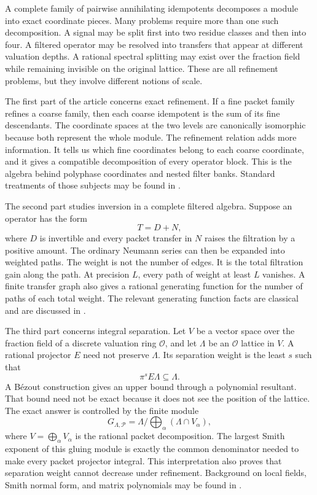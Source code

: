 \documentclass[11pt,a4paper]{article}
\theoremstyle{definition}
\theoremstyle{remark}
\newcommand{\OO}{\mathcal O}
\newcommand{\Pcal}{\mathcal P}
\providecommand{\OO}{\mathcal O}
\theoremstyle{definition}\newtheorem{construction}[theorem]{Construction}\newtheorem{certificate}[theorem]{Numerical Certificate}
\theoremstyle{remark}\newtheorem{boundary}[theorem]{Boundary}
\begin{document}
A complete family of pairwise annihilating idempotents decomposes a module into exact coordinate pieces.  Many problems require more than one such decomposition.  A signal may be split first into two residue classes and then into four.  A filtered operator may be resolved into transfers that appear at different valuation depths.  A rational spectral splitting may exist over the fraction field while remaining invisible on the original lattice.  These are all refinement problems, but they involve different notions of scale.

The first part of the article concerns exact refinement.  If a fine packet family refines a coarse family, then each coarse idempotent is the sum of its fine descendants.  The coordinate spaces at the two levels are canonically isomorphic because both represent the whole module.  The refinement relation adds more information.  It tells us which fine coordinates belong to each coarse coordinate, and it gives a compatible decomposition of every operator block.  This is the algebra behind polyphase coordinates and nested filter banks.  Standard treatments of those subjects may be found in \cite{Vaidyanathan1993,Daubechies1992}.

The second part studies inversion in a complete filtered algebra.  Suppose an operator has the form
\[
T=D+N,
\]
where $D$ is invertible and every packet transfer in $N$ raises the filtration by a positive amount.  The ordinary Neumann series can then be expanded into weighted paths.  The weight is not the number of edges.  It is the total filtration gain along the path.  At precision $L$, every path of weight at least $L$ vanishes.  A finite transfer graph also gives a rational generating function for the number of paths of each total weight.  The relevant generating function facts are classical and are discussed in \cite{Stanley2012}.

The third part concerns integral separation.  Let $V$ be a vector space over the fraction field of a discrete valuation ring $\OO$, and let $\Lambda$ be an $\OO$ lattice in $V$.  A rational projector $E$ need not preserve $\Lambda$.  Its separation weight is the least $s$ such that
\[
\pi^sE\Lambda\subseteq\Lambda.
\]
A Bézout construction gives an upper bound through a polynomial resultant.  That bound need not be exact because it does not see the position of the lattice.  The exact answer is controlled by the finite module
\[
G_{\Lambda,\Pcal}
=
\Lambda\Big/\bigoplus_{\alpha}(\Lambda\cap V_\alpha),
\]
where $V=\bigoplus_\alpha V_\alpha$ is the rational packet decomposition.  The largest Smith exponent of this gluing module is exactly the common denominator needed to make every packet projector integral.  This interpretation also proves that separation weight cannot decrease under refinement.  Background on local fields, Smith normal form, and matrix polynomials may be found in \cite{Serre1979,Newman1972,GohbergLancasterRodman2009}.
\end{document}
